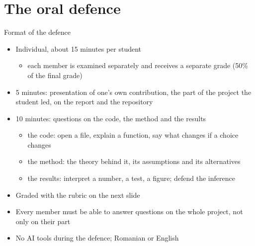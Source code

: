 \section{The oral defence}

\begin{frame}{Format of the defence}
\itemsize{\small}
\begin{itemize}
    \item Individual, about 15 minutes per student
    \begin{itemize}
        \item each member is examined separately and receives a separate grade (50\% of the final grade)
    \end{itemize}
    \item 5 minutes: presentation of one's own contribution, the part of the project the student led, on the report and the repository
    \item 10 minutes: questions on the code, the method and the results
    \begin{itemize}
        \item the code: open a file, explain a function, say what changes if a choice changes
        \item the method: the theory behind it, its assumptions and its alternatives
        \item the results: interpret a number, a test, a figure; defend the inference
    \end{itemize}
    \item Graded with the rubric on the next slide
    \item Every member must be able to answer questions on the whole project, not only on their part
    \item No AI tools during the defence; Romanian or English
\end{itemize}
\end{frame}

